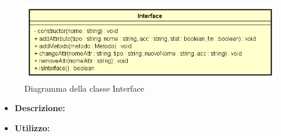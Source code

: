 \begin{figure}[h!]
	\centering
	\includegraphics[scale=0.8]{res/sections/SpecificaFrontEnd/Services/Disegnetti/interface.png}
	\caption{Diagramma della classe Interface}
\end{figure}

\begin{itemize}
	\item \textbf{Descrizione:}\\
	
	\item \textbf{Utilizzo:}\\
	

\end{itemize}

